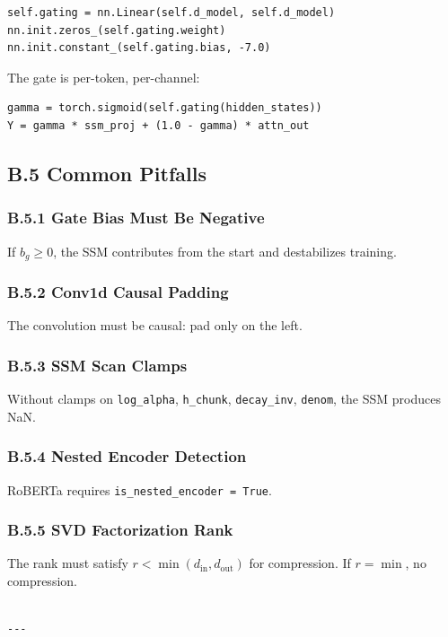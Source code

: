\begin{lstlisting}
self.gating = nn.Linear(self.d_model, self.d_model)
nn.init.zeros_(self.gating.weight)
nn.init.constant_(self.gating.bias, -7.0)
\end{lstlisting}

The gate is per-token, per-channel:
\begin{lstlisting}
gamma = torch.sigmoid(self.gating(hidden_states))
Y = gamma * ssm_proj + (1.0 - gamma) * attn_out
\end{lstlisting}

\subsection{B.5 Common Pitfalls}

\subsubsection{B.5.1 Gate Bias Must Be Negative}

If $b_g \geq 0$, the SSM contributes from the start and destabilizes training.

\subsubsection{B.5.2 Conv1d Causal Padding}

The convolution must be causal: pad only on the left.

\subsubsection{B.5.3 SSM Scan Clamps}

Without clamps on \texttt{log\_alpha}, \texttt{h\_chunk}, \texttt{decay\_inv}, \texttt{denom}, the SSM 
produces NaN.

\subsubsection{B.5.4 Nested Encoder Detection}

RoBERTa requires \texttt{is\_nested\_encoder = True}.

\subsubsection{B.5.5 SVD Factorization Rank}

The rank must satisfy $r < \min(d_\text{in}, d_\text{out})$ for 
compression. If $r = \min$, no compression.
\begin{lstlisting}

---
\end{lstlisting}